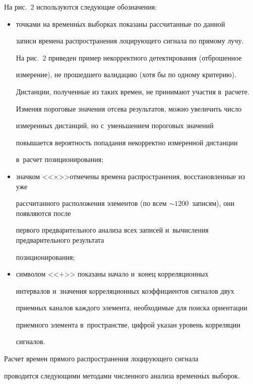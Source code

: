     На рис.~2 используются следующие обозначения:

     \begin{itemize}

\item точками на временн$\acute{\mbox{ы}}$х выборках показаны рассчитанные по данной 

записи времена распространения лоцирующего сигнала по прямому лучу. 

На рис.~2 приведен пример некорректного детектирования (отброшенное 

измерение), не прошедшего валидацию (хотя бы по одному критерию). 

Дистанции, полученные из таких времен, не принимают участия в~расчете. 

Изменяя пороговые значения отсева результатов, можно увеличить число 

измеренных дистанций, но с~уменьшением пороговых значений 

повышается вероятность попадания некорректно измеренной дистанции 

в~расчет позиционирования; 

\item значком <<$\times$>>отмечены времена распространения, восстановленные из уже 

рассчитанного расположения элементов (по всем $\sim1200$~записям), они появляются после 

первого предварительного анализа всех записей и~вычисления предварительного результата 

позиционирования;

\item символом <<$+$>> показаны начало и~конец корреляционных 

интервалов и~значения корреляционных коэффициентов сигналов двух 

приемных каналов каждого элемента, необходимые для поиска ориентации 

приемного элемента в~пространстве, цифрой указан уровень корреляции 

сигналов.

\end{itemize}



     

     Расчет времен прямого распространения лоцирующего сигнала 

проводится следующими методами численного анализа временн$\acute{\mbox{ы}}$х выборок.

